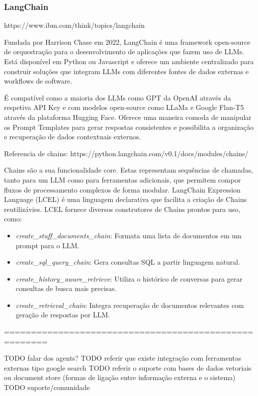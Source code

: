 \subsubsection{LangChain}


https://www.ibm.com/think/topics/langchain

Fundada por Harrison Chase em 2022, LangChain é uma framework open-source de orquestração para o desenvolvimento de aplicações que fazem uso de LLMs. Está disponível em Python ou Javascript e oferece um ambiente centralizado para construir soluções que integram LLMs com diferentes fontes de dados externas e workflows de software.

É compatível como a maioria dos LLMs como GPT da OpenAI através da respetiva API Key e com modelos open-source como LLaMa e Google Flan-T5 através da plataforma Hugging Face. 
Oferece uma maneira comoda de manipular os Prompt Templates para gerar respostas consistentes e possibilita a organização e recuperação de dados contextuais externos. 

Referencia de chains: https://python.langchain.com/v0.1/docs/modules/chains/

Chains são a sua funcionalidade core. Estas representam sequências de chamadas, tanto para um LLM como para ferramentas adicionais, que permitem compor fluxos de processamento complexos de forma modular. LangChain Expression Language (LCEL) é uma linguagem declarativa que facilita a criação de Chains reutilizávies. LCEL fornece diversos construtores de Chains prontos para uso, como: 

\begin{itemize}
	\item \textit{create\_stuff\_documents\_chain}: Formata uma lista de documentos em um prompt para o LLM.
	\item \textit{create\_sql\_query\_chain}: Gera consultas SQL a partir linguagem natural.
	\item \textit{create\_history\_aware\_retrieve}: Utiliza o histórico de conversas para gerar consultas de busca mais precisas.
	\item \textit{create\_retrieval\_chain}: Integra recuperação de documentos relevantes com geração de respostas por LLM.
\end{itemize}


======================================================

TODO falar dos agents? 
TODO referir que existe integração com ferramentas externas tipo google search 
TODO referir o suporte com bases de dados vetoriais ou document store (formas de ligação entre informação externa e o sistema)
TODO suporte/comunidade

